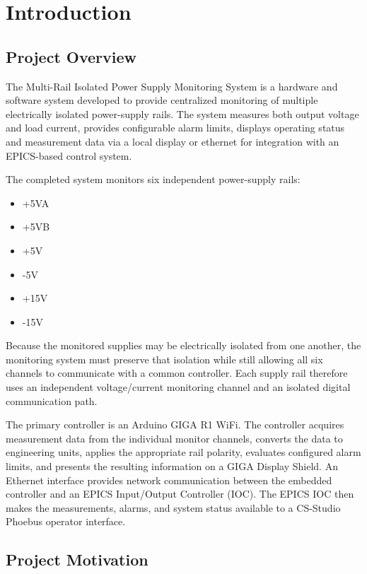 
\chapter{Introduction}
\label{chap:introduction}

\section{Project Overview}

The Multi-Rail Isolated Power Supply Monitoring System is a hardware and
software system developed to provide centralized monitoring of multiple
electrically isolated power-supply rails. The system measures both output
voltage and load current, provides configurable alarm
limits, displays operating status and measurement data via a local display or ethernet for integration with an EPICS-based control system.

The completed system monitors six independent power-supply rails:

\begin{itemize}
    \item +5VA
    \item +5VB
    \item +5V
    \item -5V
    \item +15V
    \item -15V
\end{itemize}

Because the monitored supplies may be electrically isolated from one another,
the monitoring system must preserve that isolation while still allowing all six
channels to communicate with a common controller. Each supply rail therefore
uses an independent voltage/current monitoring channel and an isolated digital
communication path.

The primary controller is an Arduino GIGA R1 WiFi. The controller acquires
measurement data from the individual monitor channels, converts the data to
engineering units, applies the appropriate rail polarity, evaluates configured
alarm limits, and presents the resulting information on a GIGA Display Shield.
An Ethernet interface provides network communication between the embedded
controller and an EPICS Input/Output Controller (IOC). The EPICS IOC then makes
the measurements, alarms, and system status available to a CS-Studio Phoebus
operator interface.


\section{Project Motivation}

